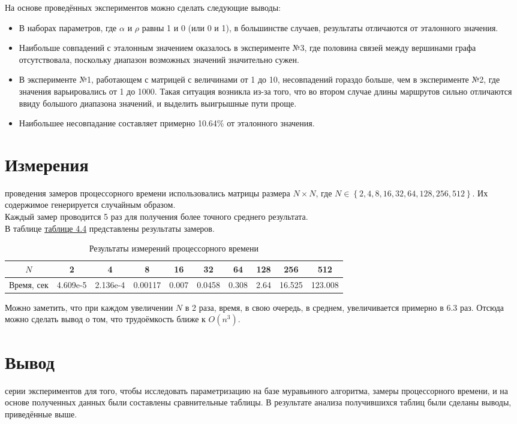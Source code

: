 На основе проведённых экспериментов можно сделать следующие выводы:
\begin{itemize}
	\item В наборах параметров, где $\alpha$ и $\rho$ равны 1 и 0 (или 0 и 1), в большинстве случаев, результаты отличаются от эталонного значения.
	\item Наибольше совпадений с эталонным значением оказалось в эксперименте №3, где половина связей между вершинами графа отсутствовала, поскольку диапазон возможных значений значительно сужен.
	\item В эксперименте №1, работающем с матрицей с величинами от 1 до 10, несовпадений гораздо больше, чем в эксперименте №2, где значения варьировались от 1 до 1000. Такая ситуация возникла из-за того, что во втором случае длины маршрутов сильно отличаются ввиду большого диапазона значений, и выделить выигрышные пути проще.
	\item Наибольшее несовпадание составляет примерно 10.64\% от эталонного значения.
\end{itemize}

\section{Измерения}
 проведения замеров процессорного времени использовались матрицы размера $N \times N$, где $N \in \left\lbrace 2, 4, 8, 16, 32, 64, 128, 256, 512 \right\rbrace$.
Их содержимое генерируется случайным образом.\\ 

Каждый замер проводится 5 раз для получения более точного среднего результата. \\

В таблице \hyperref[table_time]{таблице 4.4} представлены результаты замеров.

\begin{table}[ph] \label{table_time}
	\caption{Результаты измерений процессорного времени}
	\centering
	\begin{tabular}{|c|c|c|c|c|c|c|c|c|c|}
		\hline
		$N$ &2 &4 &8 &16 &32 &64 &128 &256 &512\\
		\hline
		Время, сек    &4.609e-5 &2.136e-4 &0.00117 &0.007 &0.0458 &0.308 &2.64 &16.525 &123.008\\
		\hline
	\end{tabular}
\end{table}

Можно заметить, что при каждом увеличении $N$ в 2 раза, время, в свою очередь, в среднем, увеличивается примерно в 6.3 раз. Отсюда можно сделать вывод о том, что трудоёмкость ближе к $O(n^3)$.

\section*{Вывод}
 серии экспериментов для того, чтобы исследовать параметризацию на базе муравьиного алгоритма, замеры процессорного времени, и на основе полученных данных были составлены сравнительные таблицы. В результате анализа получившихся таблиц были сделаны выводы, приведённые выше.
